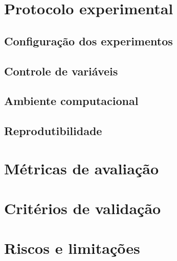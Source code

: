 \documentclass[
    12pt,
    openright,
    oneside,
    a4paper,
    english,
    brazil
]{abntex2}
\begin{document}

\section{Protocolo experimental}


\subsection{Configuração dos experimentos}
\subsection{Controle de variáveis}
\subsection{Ambiente computacional}
\subsection{Reprodutibilidade}

\section{Métricas de avaliação}


\section{Critérios de validação}


\section{Riscos e limitações}
\end{document}
